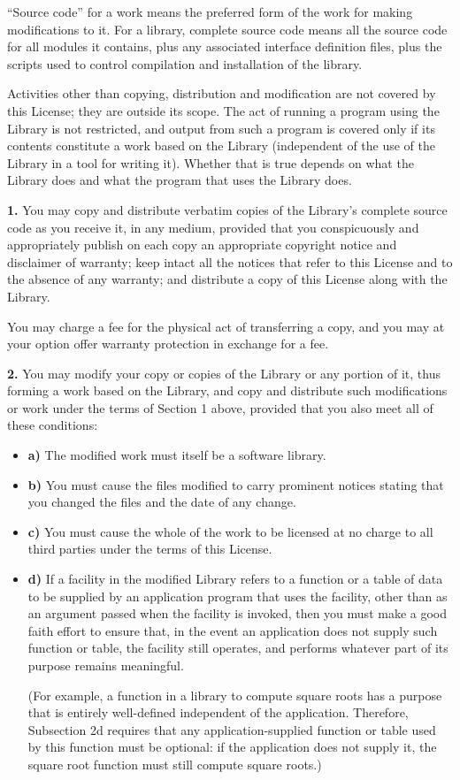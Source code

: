 \documentclass[]{article}
\begin{document}
``Source code'' for a work means the preferred form of the work for
making modifications to it. For a library, complete source code means
all the source code for all modules it contains, plus any associated
interface definition files, plus the scripts used to control compilation
and installation of the library.

Activities other than copying, distribution and modification are not
covered by this License; they are outside its scope. The act of running
a program using the Library is not restricted, and output from such a
program is covered only if its contents constitute a work based on the
Library (independent of the use of the Library in a tool for writing
it). Whether that is true depends on what the Library does and what the
program that uses the Library does.

\textbf{1.} You may copy and distribute verbatim copies of the Library's
complete source code as you receive it, in any medium, provided that you
conspicuously and appropriately publish on each copy an appropriate
copyright notice and disclaimer of warranty; keep intact all the notices
that refer to this License and to the absence of any warranty; and
distribute a copy of this License along with the Library.

You may charge a fee for the physical act of transferring a copy, and
you may at your option offer warranty protection in exchange for a fee.

\textbf{2.} You may modify your copy or copies of the Library or any
portion of it, thus forming a work based on the Library, and copy and
distribute such modifications or work under the terms of Section 1
above, provided that you also meet all of these conditions:

\begin{itemize}
\item
  \textbf{a)} The modified work must itself be a software library.
\item
  \textbf{b)} You must cause the files modified to carry prominent
  notices stating that you changed the files and the date of any change.
\item
  \textbf{c)} You must cause the whole of the work to be licensed at no
  charge to all third parties under the terms of this License.
\item
  \textbf{d)} If a facility in the modified Library refers to a function
  or a table of data to be supplied by an application program that uses
  the facility, other than as an argument passed when the facility is
  invoked, then you must make a good faith effort to ensure that, in the
  event an application does not supply such function or table, the
  facility still operates, and performs whatever part of its purpose
  remains meaningful.

  (For example, a function in a library to compute square roots has a
  purpose that is entirely well-defined independent of the application.
  Therefore, Subsection 2d requires that any application-supplied
  function or table used by this function must be optional: if the
  application does not supply it, the square root function must still
  compute square roots.)
\end{itemize}
\end{document}
